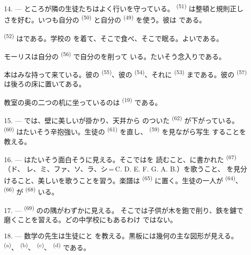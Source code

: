 14. --- ところが隣の生徒たちはよく行いを守っている。
\textsuperscript{(51)} は整頓と規則正しさを好む。いつも自分の
\textsuperscript{(50)} と自分の \textsuperscript{(49)} を使う。彼は
である。

 \textsuperscript{(52)} はである。学校の
を着て、そこで食べ、そこで眠る。よいである。

モーリスは自分の \textsuperscript{(56)} で自分のを削って
いる。たいそう念入りである。

本はみな持って来ている。彼の \textsuperscript{(55)}、彼の
 \textsuperscript{(54)}、それに \textsuperscript{(53)}
まである。彼の \textsuperscript{(57)} は後ろの床に置いてある。

教室の奥の二つの机に坐っているのは \textsuperscript{(19)} である。

\VUsaut{4.6mm}
\VUsaut{3.4mm}

15. --- では、壁に美しいが掛かり、天井から
のついた \textsuperscript{(62)} が下がっている。
 \textsuperscript{(60)} はたいそう辛抱強い。生徒の
\textsuperscript{(61)} を直し、 \textsuperscript{(59)} を見ながら写生
することを教える。

16. --- はたいそう面白そうに見える。そこではを
読むこと、に書かれた \textsuperscript{(67)} （ド、
レ、ミ、ファ、ソ、ラ、シ\,=\,C. D. E. F. G. A. B.）を歌うこと、
を見分けること、美しいを歌うことを習う。楽譜は
 \textsuperscript{(65)} に置く。生徒の一人が
\textsuperscript{(64)}、 \textsuperscript{(66)} が
 \textsuperscript{(68)} いる。

17. ---  \textsuperscript{(69)} のの隅がわずかに見える。
そこでは子供が木を鉋で削り、鉄を鑢で磨くことを習える。どの中学校にもあるわけ
ではない。

\VUsaut{5.0mm}
\VUsaut{3.6mm}

18. --- 数学の先生は生徒にと
を教える。黒板には幾何の主な図形が見える。
\textsuperscript{(a)}、 \textsuperscript{(b)}、
\textsuperscript{(c)}、 \textsuperscript{(d)} である。

